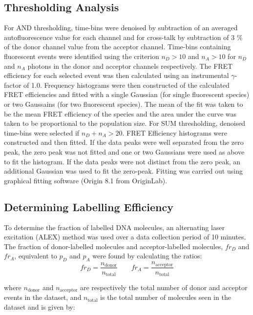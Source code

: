 \subsection*{Thresholding Analysis}
\label{subsect:thresholding}
For AND thresholding, time-bins were denoised by subtraction of an averaged autofluorescence value for each channel and for cross-talk by subtraction of 3 \% of the donor channel value from the acceptor channel. Time-bins containing fluorescent events were identified using the criterion $n_D > 10$ and $n_A > 10$ for $n_D$ and $n_A$ photons in the donor and acceptor channels respectively. The FRET efficiency for each selected event was then calculated using an instrumental $\gamma$-factor of 1.0. Frequency histograms were then constructed of the calculated FRET efficiencies and fitted with a single Gaussian (for single fluorescent species) or two Gaussains (for two fluorescent species). The mean of the fit was taken to be the mean FRET efficiency of the species and the area under the curve was taken to be proportional to the population size. For SUM thresholding, denoised time-bins were selected if $n_D + n_A > 20$. FRET Efficiency histograms were constructed and then fitted. If the data peaks were well separated from the zero peak, the zero peak was not fitted and one or two Gaussians were used as above to fit the histogram. If the data peaks were not distinct from the zero peak, an additional Gaussian was used to fit the zero-peak. Fitting was carried out using graphical fitting software (Origin 8.1 from OriginLab). 

\subsection*{Determining Labelling Efficiency}
To determine the fraction of labelled DNA molecules, an alternating laser excitation (ALEX) method was used over a data collection period of 10 minutes. The fraction of donor-labelled molecules and acceptor-labelled molecules, $fr_D$ and $fr_A$, equivalent to $p_D$ and $p_A$ were found by calculating the ratios:
\begin{equation}
fr_D = \frac{n_{\text{donor}}}{n_{\text{total}}} \qquad fr_A = \frac{n_{\text{acceptor}}}{n_{\text{total}}}
\label{eq:label}
\end{equation}

where $n_{\text{donor}}$ and $n_{\text{acceptor}}$ are respectively the total number of donor and acceptor events in the dataset, and $n_{\text{total}}$ is the total number of molecules seen in the dataset and is given by:
 
